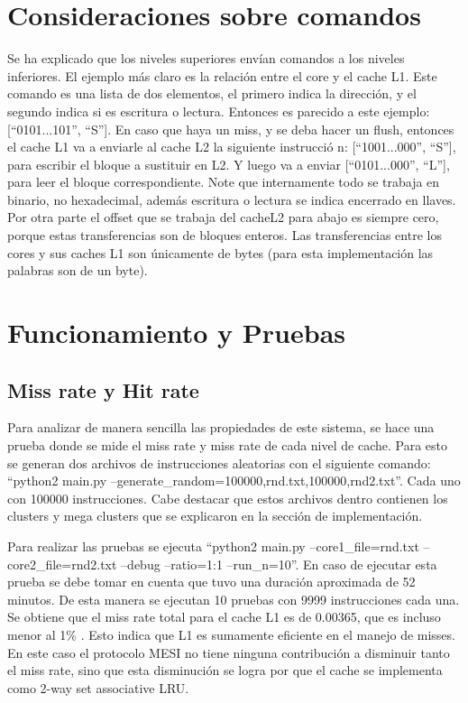 \documentclass {article}
\begin{document}
\section{Consideraciones sobre comandos}
Se ha explicado que los niveles superiores envían comandos a los niveles inferiores. El ejemplo más
claro es la relación entre el core y el cache L1. Este comando es una lista de dos elementos, el
primero indica la dirección, y el segundo indica si es escritura o lectura. Entonces es parecido a
este ejemplo: [``0101...101'', ``{S}'']. En caso que haya un miss, y se deba hacer un flush, entonces el
cache L1 va a enviarle al cache L2 la siguiente instrucci\'o n: [``1001...000'', ``{S}''], para escribir
el bloque a sustituir en L2. Y luego va a enviar [``0101...000'', ``{L}''], para leer el bloque
correspondiente. Note que internamente todo se trabaja en binario, no hexadecimal, además escritura
o lectura se indica encerrado en llaves. Por otra parte el offset que se trabaja del cacheL2 para
abajo es siempre cero, porque estas transferencias son de bloques enteros. Las transferencias entre
los cores y sus caches L1 son únicamente de bytes (para esta implementación las palabras son de un byte). 


\section{Funcionamiento y Pruebas}

\subsection{Miss rate y Hit rate}

Para analizar de manera sencilla las propiedades de este sistema, se hace una prueba donde se mide
el miss rate y miss rate de cada nivel de cache. Para esto se generan dos archivos de instrucciones
aleatorias con el siguiente comando: ``python2 main.py
--generate_random=100000,rnd.txt,100000,rnd2.txt''. Cada uno con 100000 instrucciones. Cabe destacar
que estos archivos dentro contienen los clusters y mega clusters que se explicaron en la sección de
implementación. 


Para realizar las pruebas se ejecuta ``python2 main.py --core1_file=rnd.txt --core2_file=rnd2.txt
--debug --ratio=1:1 --run_n=10''. En caso de ejecutar esta prueba se debe tomar en cuenta que tuvo
una duración aproximada de 52 minutos. De esta manera se ejecutan 10 pruebas con 9999 instrucciones cada
una. Se obtiene que el miss rate total para el cache L1 es de 0.00365, que es incluso menor al 1\%
. Esto indica que L1 es sumamente eficiente en el manejo de misses. En este caso el protocolo MESI
no tiene ninguna contribución a disminuir tanto el miss rate, sino que esta disminución se logra por
que el cache se implementa como 2-way set associative LRU. 
\end{document}
